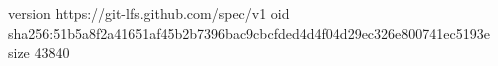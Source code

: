 version https://git-lfs.github.com/spec/v1
oid sha256:51b5a8f2a41651af45b2b7396bac9cbcfded4d4f04d29ec326e800741ec5193e
size 43840
